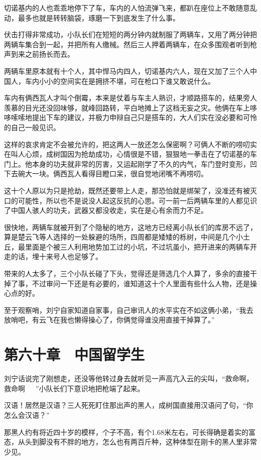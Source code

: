 切诺基内的人也乖乖地停下了车，车内的人怕流弹飞来，都趴在座位上不敢随意乱动，最多也就是转转脑袋，琢磨一下到底发生了什么事。

伏击打得非常成功，小队长们在短短的两分钟内就制服了两辆车，又用了两分钟把两辆车集合到一起，并把所有人缴械。然后三人押着两辆车，在众多围观者听到枪声到来之前扬长而去。

两辆车里原本就有十个人，其中悍马内四人，切诺基内六人，现在又加了三个人中国人，车内小小的空间实在是拥挤不堪，可在枪口下谁又敢说什么。

车内有俩西瓦人才叫个倒霉，本来是仗着与车主人熟识，才顺路搭车的，结果旁人羡慕的目光还没回味够，就峰回路转，平白地摊上了这档无妄之灾。他俩在车上哆哆嗦嗦地提出下车的建议，并极力申辩自己只是搭车的，大人们实在没必要和可怜的自己一般见识。

这样的哀求肯定不会被允许的，把这两人一放还怎么保密啊？可俩人不断的唠叨实在叫人心烦，成树国因为抢劫成功，心情很是不错，狠狠地一拳击在了切诺基的车门上。他本身的功夫就非常的厉害，又运起刚学了不久的内气，车门登时变形，凹下去碗大一块。俩西瓦人看得目瞪口呆，很自觉地闭嘴不再唠叨。

这十个人原以为只是抢劫，既然还要带上人走，那恐怕就是绑架了，没准还有被灭口的可能性，所以也不是说没人起这反抗的心思。可一前一后两辆车里的人都见识了中国人骇人的功夫，武器又都没收走，实在是心有余而力不足。

很快地，两辆车就被开到了个隐秘的地方，这地方已经离小队长们的库房不远了，算是楚云飞等人选择的一处躲避的场所，四周都是矮矮的栎树，中间是几个小土丘，最里面是个被三人利用地势加工过的小坑，不过坑虽小，把开进来的两辆车开走的话，埋十来号人也足够了。

带来的人太多了，三个小队长碰了下头，觉得还是筛选几个人算了，多余的直接干掉了事，不过审问一下还是有必要的，谁知道这十个人里面有些什么人物，还是操心点的好。

至于观察哨，刘宁自家知道自家事，自己审讯人的水平实在不如这俩小弟，“我去放哨吧，有云飞在我也懒得操心了，你俩觉得谁没用直接干掉算了。”

\section{第六十章　中国留学生}

刘宁话说完了刚想走，还没等他转过身去就听见一声高亢入云的尖叫，“救命啊，救命啊~~~”小队长们下意识地把枪端了起来。

汉语！居然是汉语？三人死死盯住那出声的黑人，成树国直接用汉语问了句，“你怎么会汉语？”

那黑人约有将近四十岁的模样，个子不高，有个1.68米左右，可长得确是着实的富态，从头到脚没有不胖的地方，怎么也有两百斤种，这种体型在刚卡的黑人里非常少见。

